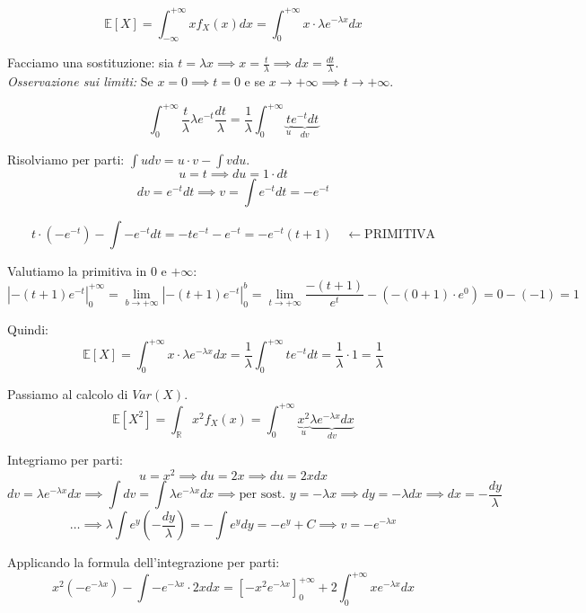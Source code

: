 \begin{equation}
\mathbb{E}[X] = \int_{-\infty}^{+\infty} x f_X(x) dx = \int_{0}^{+\infty} x \cdot \lambda e^{-\lambda x} dx
\end{equation}

Facciamo una sostituzione: sia $t = \lambda x \implies x = \frac{t}{\lambda} \implies dx = \frac{dt}{\lambda}$. \\
\textit{Osservazione sui limiti:} Se $x=0 \implies t=0$ e se $x \to +\infty \implies t \to +\infty$.

\begin{equation}
\int_{0}^{+\infty} \frac{t}{\lambda} \lambda e^{-t} \frac{dt}{\lambda} = \frac{1}{\lambda} \int_{0}^{+\infty} \underbrace{t}_{u} \underbrace{e^{-t} dt}_{dv}
\end{equation}

Risolviamo per parti: $\int u dv = u \cdot v - \int v du$.
\[ u = t \implies du = 1 \cdot dt \]
\[ dv = e^{-t} dt \implies v = \int e^{-t} dt = -e^{-t} \]

\[ t \cdot (-e^{-t}) - \int -e^{-t} dt = -t e^{-t} - e^{-t} = -e^{-t}(t + 1) \quad \longleftarrow \text{PRIMITIVA} \]

Valutiamo la primitiva in $0$ e $+\infty$:
\[ \left| -(t+1)e^{-t} \right|_0^{+\infty} = \lim_{b \to +\infty} \left| -(t+1)e^{-t} \right|_0^{b} = \lim_{t \to +\infty} \frac{-(t+1)}{e^t} - \left( -(0+1) \cdot e^0 \right) = 0 - (-1) = 1 \]

Quindi:
\begin{equation}
\mathbb{E}[X] = \int_{0}^{+\infty} x \cdot \lambda e^{-\lambda x} dx = \frac{1}{\lambda} \int_{0}^{+\infty} t e^{-t} dt = \frac{1}{\lambda} \cdot 1 = \frac{1}{\lambda}
\end{equation}

Passiamo al calcolo di $Var(X)$.
\begin{equation}
\mathbb{E}[X^2] = \int_{\mathbb{R}} x^2 f_X(x) = \int_{0}^{+\infty} \underbrace{x^2}_{u} \underbrace{\lambda e^{-\lambda x} dx}_{dv}
\end{equation}

Integriamo per parti:
\[ u = x^2 \implies du = 2x \implies du = 2x dx \]
\[ dv = \lambda e^{-\lambda x} dx \implies \int dv = \int \lambda e^{-\lambda x} dx \implies \text{per sost. } y = -\lambda x \implies dy = -\lambda dx \implies dx = -\frac{dy}{\lambda} \]
\[ \dots \implies \lambda \int e^y \left(-\frac{dy}{\lambda}\right) = - \int e^y dy = -e^y + C \implies v = -e^{-\lambda x} \]

Applicando la formula dell'integrazione per parti:
\begin{equation}
x^2 (-e^{-\lambda x}) - \int -e^{-\lambda x} \cdot 2x dx = \left[ -x^2 e^{-\lambda x} \right]_0^{+\infty} + 2 \int_{0}^{+\infty} x e^{-\lambda x} dx
\end{equation}

